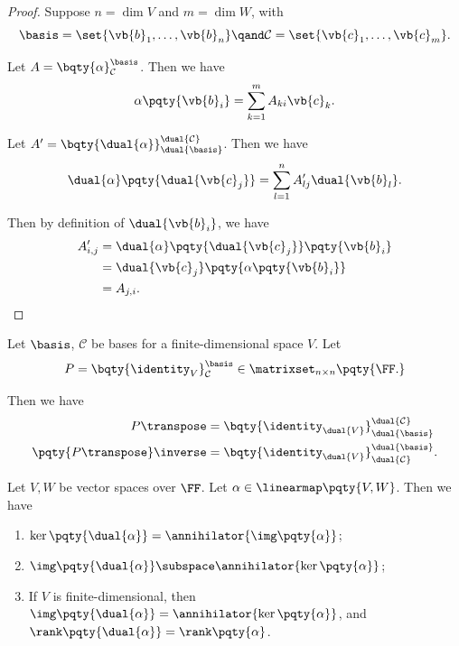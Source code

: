 \begin{proof}
    Suppose \(n = \dim V\) and \(m = \dim W\), with
    \[
        \basis = \set{\vb{b}_1, \ldots, \vb{b}_n} \qand \mathcal{C} = \set{\vb{c}_1, \ldots, \vb{c}_m}.
    \]

    Let \(A = \bqty{\alpha}_{\mathcal{C}}^{\basis}\). Then we have
    \[
        \alpha\pqty{\vb{b}_i} = \sum_{k = 1}^{m} A_{ki} \vb{c}_k.
    \]

    Let \(A' = \bqty{\dual{\alpha}}_{\dual{\basis}}^{\dual{\mathcal{C}}}\). Then we have
    \[
        \dual{\alpha} \pqty{\dual{\vb{c}_j}} = \sum_{l = 1}^{n} A'_{lj} \dual{\vb{b}_l}.
    \]

    Then by definition of \(\dual{\vb{b}_i}\), we have
    \begin{align*}
        A_{i, j}' &= \dual{\alpha} \pqty{\dual{\vb{c}_j}} \pqty{\vb{b}_i} \\
        &= \dual{\vb{c}_j} \pqty{\alpha \pqty{\vb{b}_i}} \\
        &= A_{j, i}.
    \end{align*}
\end{proof}

\begin{example}
    Let \(\basis\), \(\mathcal{C}\) be bases for a finite-dimensional space \(V\). Let
    \[
        P = \bqty{\identity_V}_{\mathcal{C}}^{\basis} \in \matrixset_{n \times n}\pqty{\FF.}
    \]

    Then we have
    \begin{align*}
        P\transpose &= \bqty{\identity_{\dual{V}}}_{\dual{\basis}}^{\dual{\mathcal{C}}} \\
        \pqty{P\transpose}\inverse &= \bqty{\identity_{\dual{V}}}_{\dual{\mathcal{C}}}^{\dual{\basis}}.
    \end{align*}
\end{example}

\begin{proposition}
    Let \(V, W\) be vector spaces over \(\FF\). Let \(\alpha \in \linearmap\pqty{V, W}\). Then we have
    \begin{enumerate}[label=(\roman*)]
        \item \(\ker\pqty{\dual{\alpha}} = \annihilator{\img\pqty{\alpha}}\);
        \item \(\img\pqty{\dual{\alpha}} \subspace \annihilator{\ker\pqty{\alpha}}\);
        \item If \(V\) is finite-dimensional, then \(\img\pqty{\dual{\alpha}} = \annihilator{\ker\pqty{\alpha}}\), and \(\rank\pqty{\dual{\alpha}} = \rank\pqty{\alpha}\).
    \end{enumerate}
\end{proposition}

